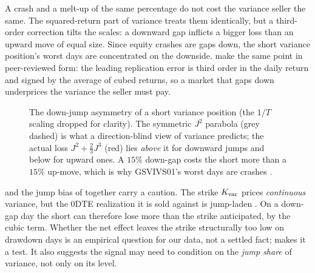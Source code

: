 \begin{intuition}
A crash and a melt-up of the same percentage do not cost the variance seller the same. The squared-return part of variance treats them identically, but a third-order correction tilts the scales: a downward gap inflicts a bigger loss than an upward move of equal size. Since equity crashes are gaps down, the short variance position's worst days are concentrated on the downside. \citet{CarrLee2009} make the same point in peer-reviewed form: the leading replication error is third order in the daily return and signed by the average of cubed returns, so a market that gaps down underprices the variance the seller must pay.
\end{intuition}

\begin{figure}[ht]
\centering
{}
\caption{The down-jump asymmetry of a short variance position (the $1/T$ scaling dropped for clarity). The symmetric $J^2$ parabola (grey dashed) is what a direction-blind view of variance predicts; the actual loss $J^2 + \tfrac23 J^3$ (red) lies \emph{above} it for downward jumps and below for upward ones. A $15\%$ down-gap costs the short more than a $15\%$ up-move, which is why GSVIVS01's worst days are crashes \citep[Table~5, p.~32]{Demeterfi1999}.}
\label{fig:gsvivs:cubic}
\end{figure}

\begin{warning}
 and the jump bias of  together carry a caution. The strike $K_{\mathrm{var}}$ prices \emph{continuous} variance, but the 0DTE realization it is sold against is jump-laden \citep{DuKapadia2012}. On a down-gap day the short can therefore lose more than the strike anticipated, by the cubic term. Whether the net effect leaves the strike structurally too low on drawdown days is an empirical question for our data, not a settled fact;  makes it a test. It also suggests the signal may need to condition on the \emph{jump share} of variance, not only on its level.
\end{warning}

